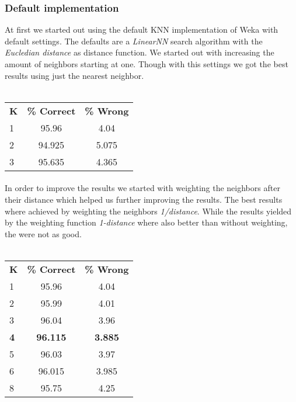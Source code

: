 \documentclass{article}
\begin{document}
\subsubsection{Default implementation}
At first we started out using the default KNN implementation of Weka with default settings. The defaults are a \emph{LinearNN} search algorithm with the \emph{Eucledian distance} as distance function. We started out with increasing the amount of neighbors starting at one. Though with this settings we got the best results using just the nearest neighbor. 
\\\\
\begin{center}
\begin{tabular}{ l | c |c }
\textbf{K} & \textbf{\% Correct} & \textbf{\% Wrong} \\
1 & 95.96 & 4.04 \\
2 & 94.925 & 5.075 \\
3 & 95.635 & 4.365 \\
\end{tabular}
\end{center}
\paragraph{}In order to improve the results we started with weighting the neighbors after their distance which helped us further improving the results. The best results where achieved by weighting the neighbors \emph{1/distance}. While the results yielded by the weighting function \emph{1-distance} where also better than without weighting, the were not as good.
\\\\
\begin{center}
\begin{tabular}{ l | c | c }
\textbf{K} & \textbf{\% Correct} & \textbf{\% Wrong} \\
1 & 95.96 & 4.04 \\
2 & 95.99& 4.01\\
3 & 96.04 & 3.96 \\
\textbf{4} & \textbf{96.115} & \textbf{3.885} \\
5 & 96.03 & 3.97 \\
6 & 96.015 & 3.985 \\
8 & 95.75 & 4.25 \\
\end{tabular}
\end{center}
\end{document}
